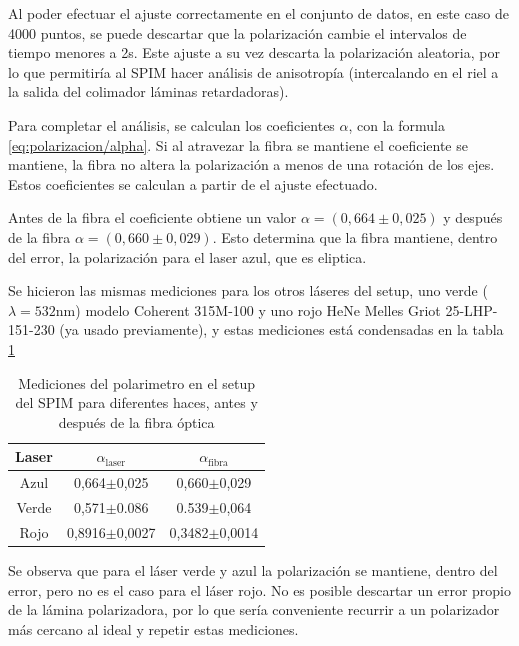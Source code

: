 Al poder efectuar el ajuste correctamente en el conjunto de datos, en este caso de 4000 puntos, se puede descartar que la polarización cambie el intervalos de tiempo menores a 2s. Este ajuste a su vez descarta la polarización aleatoria, por lo que permitiría al SPIM hacer análisis de anisotropía (intercalando en el riel a la salida del colimador láminas retardadoras).

Para completar el análisis, se calculan los coeficientes $\alpha$, con la formula \ref{eq:polarizacion/alpha}. Si al atravezar la fibra se mantiene el coeficiente se mantiene, la fibra no altera la polarización a menos de una rotación de los ejes. Estos coeficientes se calculan a partir de el ajuste efectuado. 

Antes de la fibra el coeficiente obtiene un valor $\alpha = (0,664\pm 0,025)$ y después de la fibra $\alpha = (0,660\pm0,029)$. Esto determina que la fibra mantiene, dentro del error, la polarización para el laser azul, que es eliptica.

Se hicieron las mismas mediciones para los otros láseres del setup, uno verde ($\lambda = 532$nm) modelo Coherent 315M-100 y uno rojo HeNe Melles Griot 25-LHP-151-230 (ya usado previamente), y estas mediciones está condensadas en la tabla \ref{tbl:polarimetro/mediciones}

\begin{table}[H]
    \centering
    \begin{tabular}{c|c|c}
        Laser  & $\alpha_{\text{laser}}$ & $\alpha_{\text{fibra}}$ \\ \hline
        Azul   & 0,664$\pm$0,025   & 0,660$\pm$0,029   \\
        Verde  & 0,571$\pm$0.086   & 0.539$\pm$0,064   \\
        Rojo   & 0,8916$\pm$0,0027 & 0,3482$\pm$0,0014 \\
    \end{tabular}
    \caption{Mediciones del polarimetro en el setup del SPIM para diferentes haces, antes y después de la fibra óptica}
    \label{tbl:polarimetro/mediciones}
\end{table}

Se observa que para el láser verde y azul la polarización se mantiene, dentro del error, pero no es el caso para el láser rojo. No es posible descartar un error propio de la lámina polarizadora, por lo que sería conveniente recurrir a un polarizador más cercano al ideal y repetir estas mediciones.

